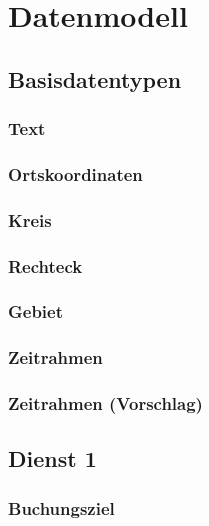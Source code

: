 \chapter{Datenmodell}
\label{sec:Datenmodell}

\section{Basisdatentypen}
\label{subsec:Datenmodell:Basis}

\subsection*{Text}


\subsection*{Ortskoordinaten}


\subsection*{Kreis}


\subsection*{Rechteck}


\subsection*{Gebiet}


\subsection*{Zeitrahmen}


\subsection*{Zeitrahmen (Vorschlag)}



\section{Dienst 1}
\label{subsec:Datenmodell:Dienst1}

\subsection*{Buchungsziel}



